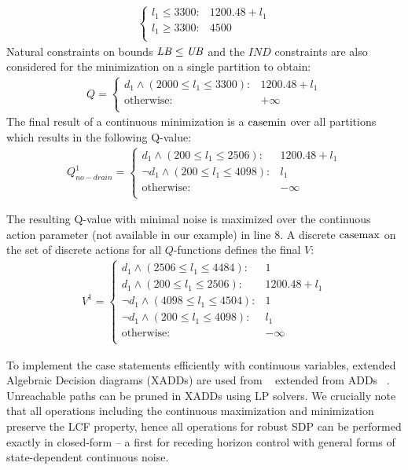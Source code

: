 \begin{itemize}
{\begin{align}
\begin{cases}
 l_1\leq  3300 :&  1200.48 + l_1 \\
  l_1\geq  3300 :&  4500 \\
\end{cases} \nonumber
\end{align}
}
Natural constraints on bounds $\mathit{LB} \leq \mathit{UB}$ and the $IND$ constraints are also considered for the minimization on a single partition to obtain: 
{\footnotesize
\begin{align}
Q =  
\begin{cases}
d_1 \land ( 2000 \leq l_1 \leq 3300 ):&  1200.48 + l_1 \\
\text{otherwise} :&  + \infty \\ 
\end{cases} \nonumber
\end{align}
}
The final result of a continuous minimization is a $\mathrm{casemin}$ over all partitions which results in the following Q-value:
{\footnotesize
\begin{align}
Q^1_{\mathit{no}-\mathit{drain}} =  
\begin{cases}
d_1 \land (200 \leq l_1 \leq 2506) : & 1200.48 + l_1 \\
\neg d_1 \land (200 \leq l_1 \leq 4098) : & l_1 \\
\text{otherwise} : & -\infty \\ 
\end{cases} \nonumber
\end{align}
}

The resulting Q-value with minimal noise is maximized over the continuous action parameter (not available in our example) in line 8. A discrete $\mathrm{casemax}$ on the set of discrete actions for all $Q$-functions defines the final $V$:
{\footnotesize
\begin{align}
V^1 =  
\begin{cases}
d_1 \land (2506 \leq l_1 \leq 4484): & 1 \\
d_1 \land (200 \leq l_1 \leq 2506): & 1200.48 + l_1 \\
\neg d_1 \land (4098 \leq l_1 \leq 4504) : & 1 \\
\neg d_1 \land (200 \leq l_1 \leq 4098) : & l_1 \\
\text{otherwise} : & -\infty \\ 
\end{cases} \nonumber
\end{align}
}
\end{itemize}

To implement the case statements efficiently with continuous variables, extended Algebraic Decision diagrams (XADDs) are used from ~\cite{sanner_uai11} extended from ADDs ~\cite{bahar93add}. Unreachable paths can be pruned in XADDs using LP solvers.  We crucially note that all operations including the continuous maximization and minimization preserve the LCF property, hence all operations for robust SDP can be performed exactly in closed-form -- a first for receding horizon control with general forms of state-dependent continuous noise.

